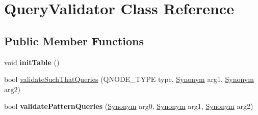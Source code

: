 \hypertarget{class_query_validator}{}\section{Query\+Validator Class Reference}
\label{class_query_validator}
\subsection*{Public Member Functions}
\begin{DoxyCompactItemize}
\item 
\hypertarget{class_query_validator_a9d70eeb0ba5385ca1e15c099cda41225}{}void {\bfseries init\+Table} ()\label{class_query_validator_a9d70eeb0ba5385ca1e15c099cda41225}

\item 
bool \hyperlink{class_query_validator_a0b8a89b0af3a6a1654b03b37e01ccb87}{validate\+Such\+That\+Queries} (Q\+N\+O\+D\+E\+\_\+\+T\+Y\+P\+E type, \hyperlink{class_synonym}{Synonym} arg1, \hyperlink{class_synonym}{Synonym} arg2)
\item 
\hypertarget{class_query_validator_ac77e452de4e51323728e8507ef5e8e58}{}bool {\bfseries validate\+Pattern\+Queries} (\hyperlink{class_synonym}{Synonym} arg0, \hyperlink{class_synonym}{Synonym} arg1, \hyperlink{class_synonym}{Synonym} arg2)\label{class_query_validator_ac77e452de4e51323728e8507ef5e8e58}

\end{DoxyCompactItemize}
